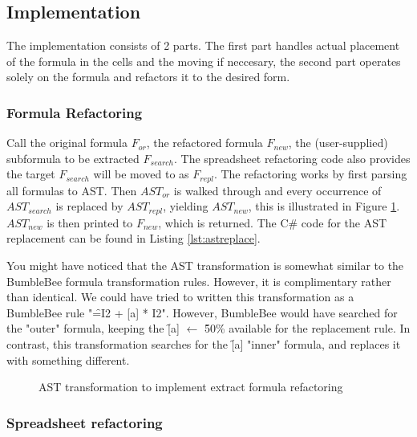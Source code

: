 \subsection{Implementation}

The implementation consists of 2 parts.
The first part handles actual placement of the formula in the cells and the moving if neccesary, the second part operates solely on the formula and refactors it to the desired form.

\subsubsection{Formula Refactoring}

Call the original formula $F_{or}$, the refactored formula $F_{new}$, the (user-supplied) subformula to be extracted $F_{search}$.
The spreadsheet refactoring code also provides the target $F_{search}$ will be moved to as $F_{repl}$.
The refactoring works by first parsing all formulas to AST.
Then $AST_{or}$ is walked through and every occurrence of $AST_{search}$ is replaced by $AST_{repl}$, yielding $AST_{new}$, this is illustrated in Figure \ref{fig:extractformulaASTtransformations}.
$AST_{new}$ is then printed to $F_{new}$, which is returned.
The C\# code for the AST replacement can be found in Listing \ref{lst:astreplace}.

You might have noticed that the AST transformation is somewhat similar to the BumbleBee formula transformation rules.
However, it is complimentary rather than identical.
We could have tried to written this transformation as a BumbleBee rule "\f{=I2 + [a] * I2}".
However, BumbleBee would have searched for the "outer" formula, keeping the \f{[a]} $\gets$ \f{50\%} available for the replacement rule.
In contrast, this transformation searches for the \f{[a]} "inner" formula, and replaces it with something different.

\begin{figure}
\centering

\caption{AST transformation to implement extract formula refactoring}
\label{fig:extractformulaASTtransformations}
\end{figure}

\subsubsection{Spreadsheet refactoring}



